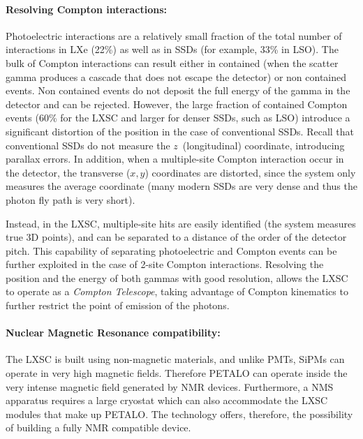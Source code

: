 \paragraph{Resolving Compton interactions:}
Photoelectric interactions are a relatively small fraction of the total number of interactions in LXe (22\%) as well as in SSDs (for example, 33\% in LSO). The bulk of Compton interactions can result either in contained (when the scatter gamma produces a cascade that does not escape the detector) or non contained events. Non contained events do not deposit the full energy of the gamma in the detector and can be rejected. However, the large fraction of contained Compton events (60\% for the LXSC and larger for denser SSDs, such as LSO) introduce a significant distortion of the position in the case of conventional SSDs. Recall that conventional SSDs do not measure the $z$~(longitudinal) coordinate, introducing parallax errors. In addition, when a multiple-site Compton interaction occur in the detector, the transverse ($x,y$) coordinates are distorted, since the system only measures the average coordinate (many modern SSDs are very dense and thus the photon fly path is very short). 

Instead, in the LXSC, multiple-site hits are easily identified (the system measures true 3D points), and can be separated to a distance of the order of the detector pitch. This capability of separating photoelectric and Compton events can be further exploited in the case of 2-site Compton interactions. Resolving the position and the energy of both gammas with good resolution, allows the LXSC to operate as a {\em Compton Telescope}, taking advantage of Compton kinematics to further restrict the point of emission of the photons. 

\paragraph{Nuclear Magnetic Resonance compatibility:}

The LXSC  is built using non-magnetic materials, and unlike PMTs, SiPMs can operate in very high magnetic fields. Therefore PETALO can operate inside the very intense magnetic field generated by NMR devices. Furthermore, a NMS apparatus requires a large cryostat which can also accommodate the LXSC modules that make up PETALO. The technology offers, therefore, the possibility of building a fully NMR compatible device.  

